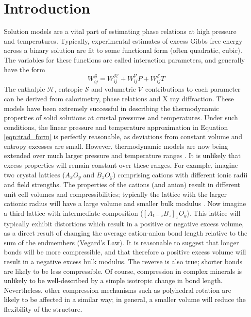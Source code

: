 \documentclass[review]{elsarticle}
\begin{document}
\linenumbers

\section{Introduction}

Solution models are a vital part of estimating phase relations at high pressure and temperatures. Typically, experimental estimates of excess Gibbs free energy across a binary solution are fit to some functional form (often quadratic, cubic). The variables for these functions are called interaction parameters, and generally have the form
\begin{equation}
  W_{ij}^{\mathcal{G}} = W_{ij}^{\mathcal{H}} + W_{ij}^{\mathcal{V}}P + W_{ij}^{\mathcal{S}}T
  \label{eqn:trad_form}
\end{equation}
\noindent The enthalpic $\mathcal{H}$, entropic $\mathcal{S}$ and volumetric $\mathcal{V}$ contributions to each parameter can be derived from calorimetry, phase relations and X ray diffraction. These models have been extremely successful in describing the thermodynamic properties of solid solutions at crustal pressures and temperatures. Under such conditions, the linear pressure and temperature approximation in Equation \ref{eqn:trad_form} is perfectly reasonable, as deviations from constant volume and entropy excesses are small. However, thermodynamic models are now being extended over much larger pressure and temperature ranges \citep{SLB2011, HP2011, HHPH2013, DKS2013}. It is unlikely that excess properties will remain constant over these ranges. For example, imagine two crystal lattices ($A_xO_y$ and $B_xO_y$) comprising cations with different ionic radii and field strengths. The properties of the cations (and anion) result in different unit cell volumes and compressibilities; typically the lattice with the larger cationic radius will have a large volume and smaller bulk modulus \citep{AA1970}. Now imagine a third lattice with intermediate composition ($[A_{1-z}B_z]_xO_y$). This lattice will typically exhibit distortions which result in a positive or negative excess volume, as a direct result of changing the average cation-anion bond length relative to the sum of the endmembers (Vegard's Law). It is reasonable to suggest that longer bonds will be more compressible, and that therefore a positive excess volume will result in a negative excess bulk modulus. The reverse is also true; shorter bonds are likely to be less compressible. Of course, compression in complex minerals is unlikely to be well-described by a simple isotropic change in bond length. Nevertheless, other compression mechanisms such as polyhedral rotation are likely to be affected in a similar way; in general, a smaller volume will reduce the flexibility of the structure.
\end{document}
